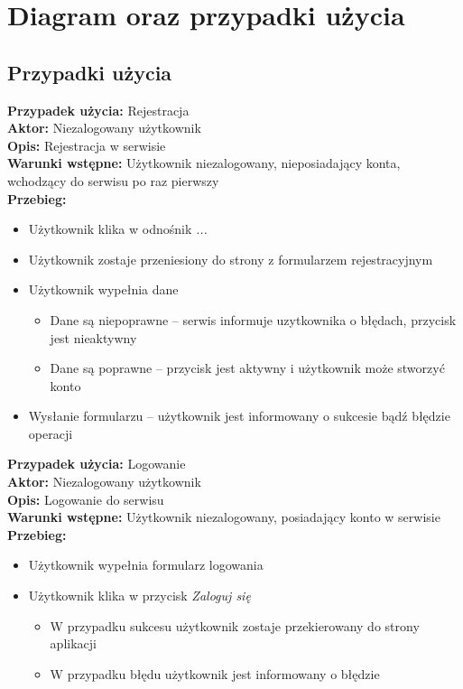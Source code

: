 \section{Diagram oraz przypadki użycia}

\subsection{Przypadki użycia}

\noindent
\textbf{Przypadek użycia:} Rejestracja \\
\textbf{Aktor:} Niezalogowany użytkownik \\
\textbf{Opis:} Rejestracja w serwisie\\
\textbf{Warunki wstępne:} Użytkownik niezalogowany, nieposiadający konta, wchodzący do serwisu po raz pierwszy\\
\textbf{Przebieg:}
\begin{itemize}
    \item Użytkownik klika w odnośnik \textit{...}
    \item Użytkownik zostaje przeniesiony do strony z formularzem rejestracyjnym
    \item  Użytkownik wypełnia dane
    \begin{itemize}
        \item Dane są niepoprawne -- serwis informuje uzytkownika o błędach, przycisk jest nieaktywny
        \item Dane są poprawne -- przycisk jest aktywny i użytkownik może stworzyć konto
    \end{itemize}
    \item Wysłanie formularzu -- użytkownik jest informowany o sukcesie bądź błędzie operacji
\end{itemize}

\textbf{Przypadek użycia:} Logowanie\\
\textbf{Aktor:} Niezalogowany użytkownik\\
\textbf{Opis:} Logowanie do serwisu\\
\textbf{Warunki wstępne:} Użytkownik niezalogowany, posiadający konto w serwisie\\
\textbf{Przebieg:}
\begin{itemize}
    \item Użytkownik wypełnia formularz logowania
    \item Użytkownik klika w przycisk \textit{Zaloguj się}
    \begin{itemize}
        \item W przypadku sukcesu użytkownik zostaje przekierowany do strony aplikacji
        \item W przypadku błędu użytkownik jest informowany o błędzie
    \end{itemize}
\end{itemize}

